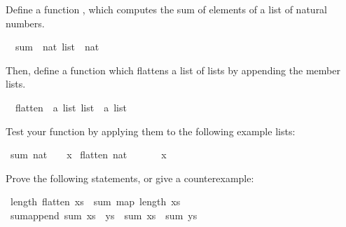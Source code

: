 %
\begin{isabellebody}%
\def\isabellecontext{a{\isadigit{1}}}%
\isamarkupfalse%
%
\isamarkuptrue%
%
\begin{isamarkuptext}%
Define a function , which computes the sum of
elements of a list of natural numbers.%
\end{isamarkuptext}%
\isamarkuptrue%
\ \ sum\ {\isacharcolon}{\isacharcolon}\ {\isachardoublequote}nat\ list\ {\isasymRightarrow}\ nat{\isachardoublequote}\isamarkupfalse%
%
\begin{isamarkuptext}%
Then, define a function  which flattens a list
of lists by appending the member lists.%
\end{isamarkuptext}%
\isamarkuptrue%
\ \ flatten\ {\isacharcolon}{\isacharcolon}\ {\isachardoublequote}{\isacharprime}a\ list\ list\ {\isasymRightarrow}\ {\isacharprime}a\ list{\isachardoublequote}\isamarkupfalse%
%
\begin{isamarkuptext}%
Test your function by applying them to the following example lists:%
\end{isamarkuptext}%
\isamarkuptrue%
\ {\isachardoublequote}sum\ {\isacharbrackleft}{}{\isacharcolon}{\isacharcolon}nat{\isacharcomma}\ {}{\isacharcomma}\ {}{\isacharbrackright}\ {\isacharequal}\ x{\isachardoublequote}\isamarkupfalse%
\isanewline
\isamarkupfalse%
\ {\isachardoublequote}flatten\ {\isacharbrackleft}{\isacharbrackleft}{}{\isacharcolon}{\isacharcolon}nat{\isacharcomma}\ {}{\isacharbrackright}{\isacharcomma}\ {\isacharbrackleft}{}{\isacharcomma}\ {}{\isacharbrackright}{\isacharcomma}\ {\isacharbrackleft}{}{\isacharcomma}\ {}{\isacharbrackright}{\isacharbrackright}\ {\isacharequal}\ x{\isachardoublequote}\isamarkupfalse%
\isamarkupfalse%
%
\begin{isamarkuptext}%
Prove the following statements, or give a counterexample:%
\end{isamarkuptext}%
\isamarkuptrue%
\ {\isachardoublequote}length\ {\isacharparenleft}flatten\ xs{\isacharparenright}\ {\isacharequal}\ sum\ {\isacharparenleft}map\ length\ xs{\isacharparenright}{\isachardoublequote}\isamarkupfalse%
\isanewline
\isamarkupfalse%
\ sum{\isacharunderscore}append{\isacharcolon}\ {\isachardoublequote}sum\ {\isacharparenleft}xs\ {\isacharat}\ ys{\isacharparenright}\ {\isacharequal}\ sum\ xs\ {\isacharplus}\ sum\ ys{\isachardoublequote}\isamarkupfalse%

\end{isabellebody}
